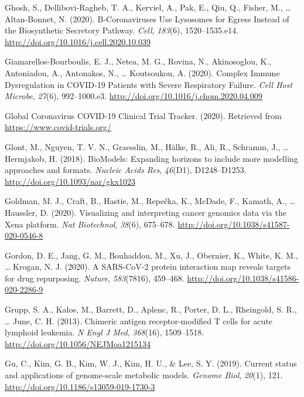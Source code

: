 \documentclass[12pt,twoside,openany,\mydriver]{thesis}  %
\begin{document}
\leavevmode\hypertarget{ref-ghosh_-coronaviruses_2020}{}%
Ghosh, S., Dellibovi-Ragheb, T. A., Kerviel, A., Pak, E., Qiu, Q., Fisher, M., \ldots{} Altan-Bonnet, N. (2020). Β-Coronaviruses Use Lysosomes for Egress Instead of the Biosynthetic Secretory Pathway. \emph{Cell}, \emph{183}(6), 1520--1535.e14. \url{http://doi.org/10.1016/j.cell.2020.10.039}

\leavevmode\hypertarget{ref-giamarellos-bourboulis_complex_2020}{}%
Giamarellos-Bourboulis, E. J., Netea, M. G., Rovina, N., Akinosoglou, K., Antoniadou, A., Antonakos, N., \ldots{} Koutsoukou, A. (2020). Complex Immune Dysregulation in COVID-19 Patients with Severe Respiratory Failure. \emph{Cell Host Microbe}, \emph{27}(6), 992--1000.e3. \url{http://doi.org/10.1016/j.chom.2020.04.009}

\leavevmode\hypertarget{ref-noauthor_global_2020}{}%
Global Coronavirus COVID-19 Clinical Trial Tracker. (2020). Retrieved from \url{https://www.covid-trials.org/}

\leavevmode\hypertarget{ref-glont_biomodels_2018}{}%
Glont, M., Nguyen, T. V. N., Graesslin, M., Hälke, R., Ali, R., Schramm, J., \ldots{} Hermjakob, H. (2018). BioModels: Expanding horizons to include more modelling approaches and formats. \emph{Nucleic Acids Res}, \emph{46}(D1), D1248--D1253. \url{http://doi.org/10.1093/nar/gkx1023}

\leavevmode\hypertarget{ref-goldman_visualizing_2020}{}%
Goldman, M. J., Craft, B., Hastie, M., Repečka, K., McDade, F., Kamath, A., \ldots{} Haussler, D. (2020). Visualizing and interpreting cancer genomics data via the Xena platform. \emph{Nat Biotechnol}, \emph{38}(6), 675--678. \url{http://doi.org/10.1038/s41587-020-0546-8}

\leavevmode\hypertarget{ref-gordon_sars-cov-2_2020}{}%
Gordon, D. E., Jang, G. M., Bouhaddou, M., Xu, J., Obernier, K., White, K. M., \ldots{} Krogan, N. J. (2020). A SARS-CoV-2 protein interaction map reveals targets for drug repurposing. \emph{Nature}, \emph{583}(7816), 459--468. \url{http://doi.org/10.1038/s41586-020-2286-9}

\leavevmode\hypertarget{ref-grupp_chimeric_2013}{}%
Grupp, S. A., Kalos, M., Barrett, D., Aplenc, R., Porter, D. L., Rheingold, S. R., \ldots{} June, C. H. (2013). Chimeric antigen receptor-modified T cells for acute lymphoid leukemia. \emph{N Engl J Med}, \emph{368}(16), 1509--1518. \url{http://doi.org/10.1056/NEJMoa1215134}

\leavevmode\hypertarget{ref-gu_current_2019}{}%
Gu, C., Kim, G. B., Kim, W. J., Kim, H. U., \& Lee, S. Y. (2019). Current status and applications of genome-scale metabolic models. \emph{Genome Biol}, \emph{20}(1), 121. \url{http://doi.org/10.1186/s13059-019-1730-3}
\end{document}

